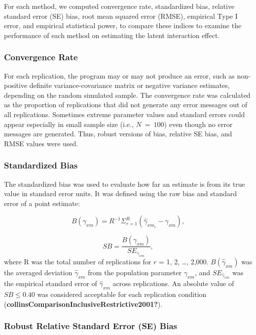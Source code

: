 \documentclass[
  man]{apa6}
\begin{document}
For each method, we computed convergence rate, standardized bias, relative standard error (SE) bias, root mean squared error (RMSE), empirical Type I error, and empirical statistical power, to compare these indices to examine the performance of each method on estimating the latent interaction effect.

\subsubsection{Convergence Rate}\label{convergence-rate}

For each replication, the program may or may not produce an error, such as non-positive definite variance-covariance matrix or negative variance estimates, depending on the random simulated sample. The convergence rate was calculated as the proportion of replications that did not generate any error messages out of all replications.
Sometimes extreme parameter values and standard errors could appear especially in small sample size (i.e., \(N \ = \ 100\)) even though no error messages are generated. Thus, robust versions of bias, relative SE bias, and RMSE values were used.

\subsubsection{Standardized Bias}\label{standardized-bias}

The standardized bias was used to evaluate how far an estimate is from its true value in standard error units. It was defined using the raw bias and standard error of a point estimate:

\begin{equation}
B(\gamma_{xm}) = R^{-1}\Sigma^{R}_{r = 1}(\hat{\gamma}_{xm_{r}} - \gamma_{xm}),
\end{equation}

\begin{equation}
SB = \frac{B(\gamma_{xm})}{SE_{\gamma_{xm}}},
\end{equation}
where R was the total number of replications for \(r\) = 1, 2, \ldots, 2,000. \(B(\hat{\gamma}_{xm})\) was the averaged deviation \(\hat{\gamma}_{xm}\) from the population parameter \(\gamma_{xm}\), and \(SE_{\hat{\gamma}_{xm}}\) was the empirical standard error of \(\hat{\gamma}_{xm}\) across replications. An absolute value of \(SB \le 0.40\) was considered acceptable for each replication condition (\textbf{collinsComparisonInclusiveRestrictive2001?}).

\subsubsection{Robust Relative Standard Error (SE) Bias}\label{robust-relative-standard-error-se-bias}
\end{document}
